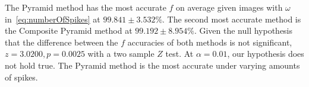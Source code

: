 The Pyramid method has the most accurate $f$ on average given images with $\omega$ in~\autoref{eq:numberOfSpikes}
at $99.841 \pm 3.532\%$.
The second most accurate method is the Composite Pyramid method at $99.192 \pm 8.954\%$.
Given the null hypothesis that the difference between the $f$ accuracies of both methods is not significant,
$z = 3.0200, p = 0.0025$ with a two sample $Z$ test.
At $\alpha = 0.01$, our hypothesis does not hold true.
The Pyramid method is the most accurate under varying amounts of spikes.
